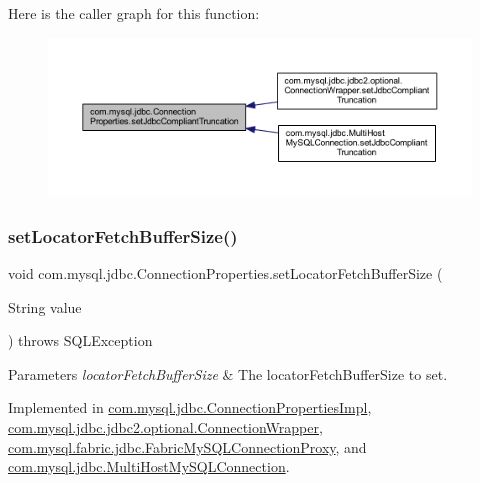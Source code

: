 Here is the caller graph for this function\+:\nopagebreak
\begin{figure}[H]
\begin{center}
\leavevmode
\includegraphics[width=350pt]{interfacecom_1_1mysql_1_1jdbc_1_1_connection_properties_aa770c64e002c6ab1cb335107d0380476_icgraph}
\end{center}
\end{figure}
\mbox{\label{interfacecom_1_1mysql_1_1jdbc_1_1_connection_properties_ae7d48146159a39b7171b4b5a074466c1}} 
\subsubsection{\texorpdfstring{set\+Locator\+Fetch\+Buffer\+Size()}{setLocatorFetchBufferSize()}}
{\footnotesize\ttfamily void com.\+mysql.\+jdbc.\+Connection\+Properties.\+set\+Locator\+Fetch\+Buffer\+Size (\begin{DoxyParamCaption}\item[{String}]{value }\end{DoxyParamCaption}) throws S\+Q\+L\+Exception}


\begin{DoxyParams}{Parameters}
{\em locator\+Fetch\+Buffer\+Size} & The locator\+Fetch\+Buffer\+Size to set. \\
\hline
\end{DoxyParams}


Implemented in \mbox{\hyperlink{classcom_1_1mysql_1_1jdbc_1_1_connection_properties_impl_a1214ced2b9a6dbbaebd36c45acb2538b}{com.\+mysql.\+jdbc.\+Connection\+Properties\+Impl}}, \mbox{\hyperlink{classcom_1_1mysql_1_1jdbc_1_1jdbc2_1_1optional_1_1_connection_wrapper_a81b230b8f38e3faa698214cb79cb03b6}{com.\+mysql.\+jdbc.\+jdbc2.\+optional.\+Connection\+Wrapper}}, \mbox{\hyperlink{classcom_1_1mysql_1_1fabric_1_1jdbc_1_1_fabric_my_s_q_l_connection_proxy_aba70c482bafff88ea4fbc7d2ff914e50}{com.\+mysql.\+fabric.\+jdbc.\+Fabric\+My\+S\+Q\+L\+Connection\+Proxy}}, and \mbox{\hyperlink{classcom_1_1mysql_1_1jdbc_1_1_multi_host_my_s_q_l_connection_a2c06dae5dc39a0e78d8f40f916376021}{com.\+mysql.\+jdbc.\+Multi\+Host\+My\+S\+Q\+L\+Connection}}.

